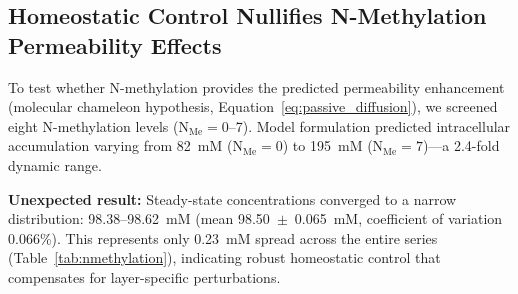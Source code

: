 \documentclass[10pt,letterpaper]{article}
\begin{document}
\subsection{Homeostatic Control Nullifies N-Methylation Permeability Effects}

To test whether N-methylation provides the predicted permeability enhancement (molecular chameleon hypothesis, Equation~\ref{eq:passive_diffusion}), we screened eight N-methylation levels (N$_{\text{Me}} = 0$--7). Model formulation predicted intracellular accumulation varying from 82~mM (N$_{\text{Me}} = 0$) to 195~mM (N$_{\text{Me}} = 7$)---a 2.4-fold dynamic range.

\textbf{Unexpected result:} Steady-state concentrations converged to a narrow distribution: 98.38--98.62~mM (mean 98.50~$\pm$~0.065~mM, coefficient of variation 0.066\%). This represents only 0.23~mM spread across the entire series (Table~\ref{tab:nmethylation}), indicating robust homeostatic control that compensates for layer-specific perturbations.

\begin{table}[H]
\centering
\caption{N-Methylation Sweep: Homeostatic Control Dominance}
\label{tab:nmethylation}
\end{table}
\end{document}
